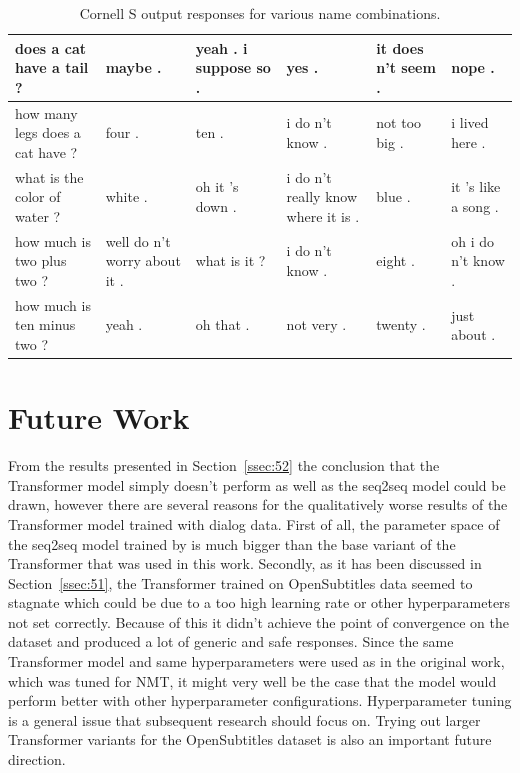 \documentclass[12pt]{article}
\begin{document}
\begin{table}[H]
\begin{tabular}{|L{2.3cm}|L{2.3cm}|L{2.3cm}|L{2.3cm}|L{2.3cm}|L{2.3cm}|}
		does a cat have a tail ? & maybe . & yeah . i suppose so . & yes . & it does n't seem . & nope .
		\\ \hline
		how many legs does a cat have ? & four . & ten . & i do n't know . & not too big . & i lived here .
		\\ \hline
		what is the color of water ? & white . & oh it 's down . & i do n't really know where it is . & blue . & it 's like a song .
		\\ \hline
		how much is two plus two ? & well do n't worry about it . & what is it ? & i do n't know . & eight . & oh i do n't know .
		\\ \hline
		how much is ten minus two ? & yeah . & oh that . & not very . & twenty . & just about .
		\\ \hline
		
	\end{tabular}
	\caption{Cornell S output responses for various name combinations.}	
	\label{table:CornellS1}
\end{table}


\newpage\section{Future Work} \label{sec:future}
From the results presented in Section~\ref{ssec:52} the conclusion that the Transformer model simply doesn't perform as well as the seq2seq model could be drawn, however there are several reasons for the qualitatively worse results of the Transformer model trained with dialog data. First of all, the parameter space of the seq2seq model trained by \cite{Vinyals:2015} is much bigger than the base variant of the Transformer that was used in this work. Secondly, as it has been discussed in Section~\ref{ssec:51}, the Transformer trained on OpenSubtitles data seemed to stagnate which could be due to a too high learning rate or other hyperparameters not set correctly. Because of this it didn't achieve the point of convergence on the dataset and produced a lot of generic and safe responses. Since the same Transformer model and same hyperparameters were used as in the original work, which was tuned for NMT, it might very well be the case that the model would perform better with other hyperparameter configurations. Hyperparameter tuning is a general issue that subsequent research should focus on. Trying out larger Transformer variants for the OpenSubtitles dataset is also an important future direction.
\end{document}
